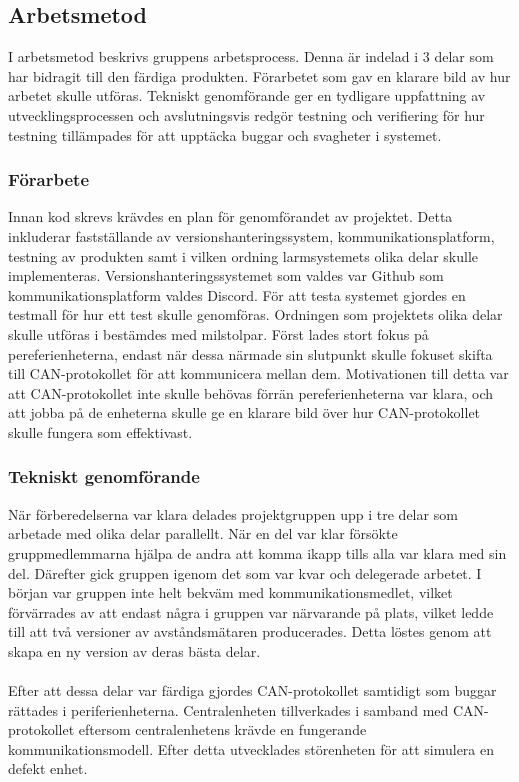 \documentclass{article}
\begin{document}
\subsection{Arbetsmetod}
I arbetsmetod beskrivs gruppens arbetsprocess. Denna är indelad i 3 delar som har bidragit till den färdiga produkten. Förarbetet som gav en klarare bild av hur arbetet skulle utföras. Tekniskt genomförande ger en tydligare uppfattning av utvecklingsprocessen och avslutningsvis redgör testning och verifiering för hur testning tillämpades för att upptäcka buggar och svagheter i systemet.

\subsubsection{Förarbete}
Innan kod skrevs krävdes en plan för genomförandet av projektet.
Detta inkluderar fastställande av versionshanteringssystem, kommunikationsplatform, testning av produkten samt i vilken ordning larmsystemets olika delar skulle implementeras.
Versionshanteringssystemet som valdes var Github som kommunikationsplatform valdes Discord.
För att testa systemet gjordes en testmall för hur ett test skulle genomföras. 
Ordningen som projektets olika delar skulle utföras i bestämdes med milstolpar. Först lades stort fokus på pereferienheterna, endast när dessa närmade sin slutpunkt skulle fokuset skifta till CAN-protokollet för att kommunicera mellan dem. 
Motivationen till detta var att CAN-protokollet inte skulle behövas förrän pereferienheterna var klara, och att jobba på de enheterna skulle ge en klarare bild över hur CAN-protokollet skulle fungera som effektivast.

\subsubsection{Tekniskt genomförande}
När förberedelserna var klara delades projektgruppen upp i tre delar som arbetade med olika delar parallellt. När en del var klar försökte gruppmedlemmarna hjälpa de andra att komma ikapp tills alla var klara med sin del. Därefter gick gruppen igenom det som var kvar och delegerade arbetet. I början var gruppen inte helt bekväm med kommunikationsmedlet, vilket förvärrades av att endast några i gruppen var närvarande på plats, vilket ledde till att två versioner av avståndsmätaren producerades. Detta löstes genom att skapa en ny version av deras bästa delar.
\\
\\
Efter att dessa delar var färdiga gjordes CAN-protokollet samtidigt som buggar rättades i periferienheterna. Centralenheten tillverkades i samband med CAN-protokollet eftersom centralenhetens krävde en fungerande kommunikationsmodell. Efter detta utvecklades störenheten för att simulera en defekt enhet.
\end{document}
